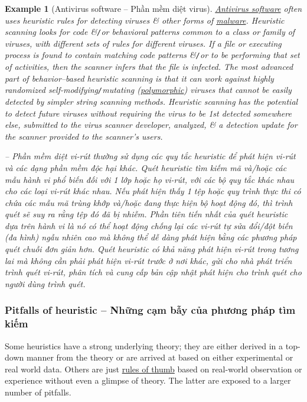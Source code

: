 \documentclass{article}
\newtheorem{example}{Example}
\begin{document}
\begin{example}[Antivirus software -- Phần mềm diệt virus]
	\href{https://en.wikipedia.org/wiki/Antivirus_software}{Antivirus software} often uses heuristic rules for detecting viruses \& other forms of \href{https://en.wikipedia.org/wiki/Malware}{malware}. Heuristic scanning looks for code \&{\tt/}or behavioral patterns common to a class or family of viruses, with different sets of rules for different viruses. If a file or executing process is found to contain matching code patterns \&{\tt/}or to be performing that set of activities, then the scanner infers that the file is infected. The most advanced part of behavior--based heuristic scanning is that it can work against highly randomized self-modifying{\tt/}mutating (\href{https://en.wikipedia.org/wiki/Polymorphic_code}{polymorphic}) viruses that cannot be easily detected by simpler string scanning methods. Heuristic scanning has the potential to detect future viruses without requiring the virus to be 1st detected somewhere else, submitted to the virus scanner developer, analyzed, \& a detection update for the scanner provided to the scanner's users.
	
	-- Phần mềm diệt vi-rút thường sử dụng các quy tắc heuristic để phát hiện vi-rút và các dạng phần mềm độc hại khác. Quét heuristic tìm kiếm mã và/hoặc các mẫu hành vi phổ biến đối với 1 lớp hoặc họ vi-rút, với các bộ quy tắc khác nhau cho các loại vi-rút khác nhau. Nếu phát hiện thấy 1 tệp hoặc quy trình thực thi có chứa các mẫu mã trùng khớp và/hoặc đang thực hiện bộ hoạt động đó, thì trình quét sẽ suy ra rằng tệp đó đã bị nhiễm. Phần tiên tiến nhất của quét heuristic dựa trên hành vi là nó có thể hoạt động chống lại các vi-rút tự sửa đổi/đột biến (đa hình) ngẫu nhiên cao mà không thể dễ dàng phát hiện bằng các phương pháp quét chuỗi đơn giản hơn. Quét heuristic có khả năng phát hiện vi-rút trong tương lai mà không cần phải phát hiện vi-rút trước ở nơi khác, gửi cho nhà phát triển trình quét vi-rút, phân tích và cung cấp bản cập nhật phát hiện cho trình quét cho người dùng trình quét.
\end{example}

\subsubsection{Pitfalls of heuristic -- Những cạm bẫy của phương pháp tìm kiếm}
Some heuristics have a strong underlying theory; they are either derived in a top-down manner from the theory or are arrived at based on either experimental or real world data. Others are just \href{https://en.wikipedia.org/wiki/Rule_of_thumb}{rules of thumb} based on real-world observation or experience without even a glimpse of theory. The latter are exposed to a larger number of pitfalls.
\end{document}
